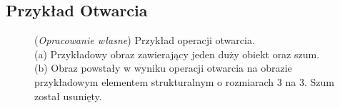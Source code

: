 \documentclass{article}
\begin{document}
    \subsection{Przykład Otwarcia}
    \begin{figure}[H]
        \centering
        \qquad
        \caption
        {
            (\textit{Opracowanie własne}) Przykład operacji otwarcia.\\
            (a) Przykładowy obraz zawierający jeden duży obiekt oraz szum.\\
            (b) Obraz powstały w wyniku operacji otwarcia na obrazie przykładowym elementem strukturalnym o rozmiarach 3 na 3.
            Szum został usunięty.
        }
    \end{figure}
\end{document}
